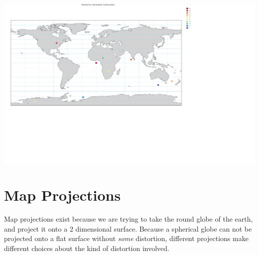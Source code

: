 \documentclass[
  letterpaper,
  DIV=11,
  numbers=noendperiod,
  oneside]{scrreprt}
\begin{document}
\includegraphics{latitude-and-longitude_files/figure-pdf/unnamed-chunk-3-1.pdf}

\chapter{Map Projections}\label{sec-projections}

Map projections exist because we are trying to take the round globe of
the earth, and project it onto a 2 dimensional surface. Because a
spherical globe can not be projected onto a flat surface without
\emph{some} distortion, different projections make different choices
about the kind of distortion involved.
\end{document}
